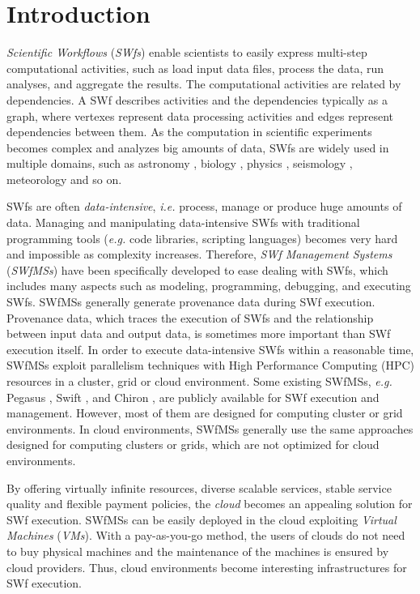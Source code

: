 \chapter{Introduction} \label{Intro}

\textit{Scientific Workflows} (\textit{SWfs}) enable scientists to easily express multi-step computational activities, such as load input data files, process the data, run analyses, and aggregate the results. The computational activities are related by dependencies. A SWf describes activities and the dependencies typically as a graph, where vertexes represent data processing activities and edges represent dependencies between them. 
As the computation in scientific experiments becomes complex and analyzes big amounts of data, SWfs are widely used in multiple domains, such as astronomy \cite{Deelman2008}, biology \cite{Ocana2012}, physics \cite{Ogasawara2011}, seismology \cite{Deelman2006z}, meteorology \cite{Woitaszek2011} and so on.

SWfs are often \textit{data-intensive}, \textit{i.e.} process, manage or produce huge amounts of data.
Managing and manipulating data-intensive SWfs with traditional programming tools (\textit{e.g.} code libraries, scripting languages) becomes very hard and impossible as complexity increases. 
Therefore, \textit{SWf Management Systems} (\textit{SWfMSs}) have been specifically developed to ease dealing with SWfs, which includes many aspects such as modeling, programming, debugging, and executing SWfs. 
SWfMSs generally generate provenance data during SWf execution.
Provenance data, which traces the execution of SWfs and the relationship between input data and output data, is sometimes more important than SWf execution itself.
In order to execute data-intensive SWfs within a reasonable time, SWfMSs exploit parallelism techniques with High Performance Computing (HPC) resources in a cluster, grid or cloud environment. 
Some existing SWfMSs, \textit{e.g.} Pegasus \cite{Deelman2005,Deelman2014}, Swift \cite{Zhao2007},
and Chiron \cite{Ogasawara2013}, are publicly available for SWf execution and management. 
However, most of them are designed for computing cluster or grid environments. 
In cloud environments, SWfMSs generally use the same approaches designed for computing clusters or grids, which are not optimized for cloud environments. 

By offering virtually infinite resources, diverse scalable services, stable service quality and flexible payment policies, 
the \textit{cloud} becomes an appealing solution for SWf execution. 
SWfMSs can be easily deployed in the cloud exploiting \textit{Virtual Machines} (\textit{VMs}). 
With a pay-as-you-go method, the users of clouds do not need to buy physical machines and the maintenance of the machines is ensured by cloud providers. 
Thus, cloud environments become interesting infrastructures for SWf execution.

